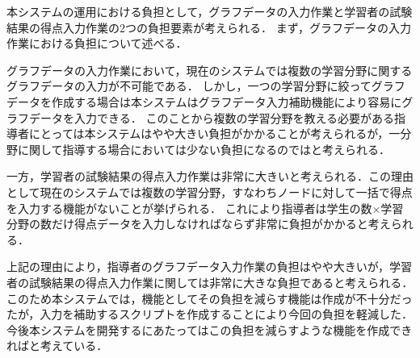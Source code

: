 本システムの運用における負担として，グラフデータの入力作業と学習者の試験結果の得点入力作業の2つの負担要素が考えられる．
まず，グラフデータの入力作業における負担について述べる．

グラフデータの入力作業において，現在のシステムでは複数の学習分野に関するグラフデータの入力が不可能である．
しかし，一つの学習分野に絞ってグラフデータを作成する場合は本システムはグラフデータ入力補助機能により容易にグラフデータを入力できる．
このことから複数の学習分野を教える必要がある指導者にとっては本システムはやや大きい負担がかかることが考えられるが，一分野に関して指導する場合においては少ない負担になるのではと考えられる．

一方，学習者の試験結果の得点入力作業は非常に大きいと考えられる．この理由として現在のシステムでは複数の学習分野，すなわちノードに対して一括で得点を入力する機能がないことが挙げられる．
これにより指導者は学生の数×学習分野の数だけ得点データを入力しなければならず非常に負担がかかると考えられる．

上記の理由により，指導者のグラフデータ入力作業の負担はやや大きいが，学習者の試験結果の得点入力作業に関しては非常に大きな負担であると考えられる．
このため本システムでは，機能としてその負担を減らす機能は作成が不十分だったが，入力を補助するスクリプトを作成することにより今回の負担を軽減した．
今後本システムを開発するにあたってはこの負担を減らすような機能を作成できればと考えている．
